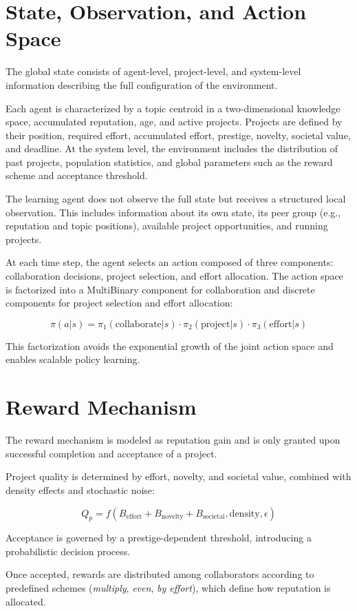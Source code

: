 \documentclass[english,bachelor]{hsluthesis}
\begin{document}
\section{State, Observation, and Action Space}
The global state consists of agent-level, project-level, and system-level information describing the full configuration of the environment.

Each agent is characterized by a topic centroid in a two-dimensional knowledge space, accumulated reputation, age, and active projects. Projects are defined by their position, required effort, accumulated effort, prestige, novelty, societal value, and deadline. At the system level, the environment includes the distribution of past projects, population statistics, and global parameters such as the reward scheme and acceptance threshold.

The learning agent does not observe the full state but receives a structured local observation. This includes information about its own state, its peer group (e.g., reputation and topic positions), available project opportunities, and running projects.

At each time step, the agent selects an action composed of three components: collaboration decisions, project selection, and effort allocation. The action space is factorized into a MultiBinary component for collaboration and discrete components for project selection and effort allocation:

$$
\pi(a|s)=\pi_1(\text{collaborate}|s)\cdot\pi_2(\text{project}|s)\cdot\pi_3(\text{effort}|s)
$$

This factorization avoids the exponential growth of the joint action space and enables scalable policy learning.


\section{Reward Mechanism}
The reward mechanism is modeled as reputation gain and is only granted upon successful completion and acceptance of a project.

Project quality is determined by effort, novelty, and societal value, combined with density effects and stochastic noise:

$$
Q_p = f(B_{\text{effort}} + B_{\text{novelty}} + B_{\text{societal}}, \text{density}, \epsilon)
$$

Acceptance is governed by a prestige-dependent threshold, introducing a probabilistic decision process.

Once accepted, rewards are distributed among collaborators according to predefined schemes (\textit{multiply}, \textit{even}, \textit{by effort}), which define how reputation is allocated.
\end{document}
